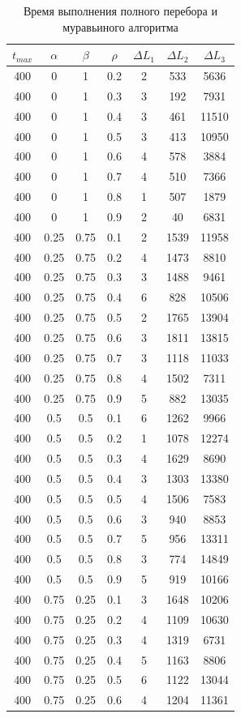 \documentclass[a4paper,oneside,14pt]{extreport}
\begin{document}
\newpage
\begin{table}[H]
	\begin{center}
		\caption[]{\label{tbl:only} Время выполнения полного перебора и муравьиного алгоритма}
		\begin{tabular}{|c|c|c|c|c|c|c|}
			\hline
			$t_{max}$ & $\alpha$ & $\beta$ & $\rho$ & $\Delta L_{1}$ & $\Delta L_{2}$ & $\Delta L_{3}$\\
			\hline			
			400 & 0 & 1 & 0.2 & 2 & 533 & 5636 \\
			400 & 0 & 1 & 0.3 & 3 & 192 & 7931 \\
			400 & 0 & 1 & 0.4 & 3 & 461 & 11510 \\
			400 & 0 & 1 & 0.5 & 3 & 413 & 10950 \\
			400 & 0 & 1 & 0.6 & 4 & 578 & 3884 \\
			400 & 0 & 1 & 0.7 & 4 & 510 & 7366 \\
			400 & 0 & 1 & 0.8 & 1 & 507 & 1879 \\
			400 & 0 & 1 & 0.9 & 2 & 40 & 6831 \\
			400 & 0.25 & 0.75 & 0.1 & 2 & 1539 & 11958 \\
			400 & 0.25 & 0.75 & 0.2 & 4 & 1473 & 8810 \\
			400 & 0.25 & 0.75 & 0.3 & 3 & 1488 & 9461 \\
			400 & 0.25 & 0.75 & 0.4 & 6 & 828 & 10506 \\
			400 & 0.25 & 0.75 & 0.5 & 2 & 1765 & 13904 \\
			400 & 0.25 & 0.75 & 0.6 & 3 & 1811 & 13815 \\
			400 & 0.25 & 0.75 & 0.7 & 3 & 1118 & 11033 \\
			400 & 0.25 & 0.75 & 0.8 & 4 & 1502 & 7311 \\
			400 & 0.25 & 0.75 & 0.9 & 5 & 882 & 13035 \\
			400 & 0.5 & 0.5 & 0.1 & 6 & 1262 & 9966 \\
			400 & 0.5 & 0.5 & 0.2 & 1 & 1078 & 12274 \\
			400 & 0.5 & 0.5 & 0.3 & 4 & 1629 & 8690 \\
			400 & 0.5 & 0.5 & 0.4 & 3 & 1303 & 13380 \\
			400 & 0.5 & 0.5 & 0.5 & 4 & 1506 & 7583 \\
			400 & 0.5 & 0.5 & 0.6 & 3 & 940 & 8853 \\
			400 & 0.5 & 0.5 & 0.7 & 5 & 956 & 13311 \\
			400 & 0.5 & 0.5 & 0.8 & 3 & 774 & 14849 \\
			400 & 0.5 & 0.5 & 0.9 & 5 & 919 & 10166 \\
			400 & 0.75 & 0.25 & 0.1 & 3 & 1648 & 10206 \\
			400 & 0.75 & 0.25 & 0.2 & 4 & 1109 & 10630 \\
			400 & 0.75 & 0.25 & 0.3 & 4 & 1319 & 6731 \\
			400 & 0.75 & 0.25 & 0.4 & 5 & 1163 & 8806 \\
			400 & 0.75 & 0.25 & 0.5 & 6 & 1122 & 13044 \\
			400 & 0.75 & 0.25 & 0.6 & 4 & 1204 & 11361 \\
			\hline 	
		\end{tabular}
	\end{center}
\end{table}
\end{document}
